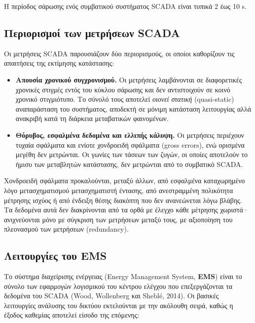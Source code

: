 Η περίοδος σάρωσης ενός συμβατικού συστήματος SCADA είναι τυπικά 2 έως 10 s.

\subsection{Περιορισμοί των μετρήσεων SCADA}

Οι μετρήσεις SCADA παρουσιάζουν δύο περιορισμούς, οι οποίοι καθορίζουν τις απαιτήσεις της
εκτίμησης κατάστασης:

\begin{itemize}
\item \textbf{Απουσία χρονικού συγχρονισμού.} Οι μετρήσεις λαμβάνονται σε διαφορετικές
      χρονικές στιγμές εντός του κύκλου σάρωσης και δεν αντιστοιχούν σε κοινό χρονικό
      στιγμιότυπο. Το σύνολό τους αποτελεί \emph{οιονεί στατική} (quasi-static)
      αναπαράσταση του συστήματος, αποδεκτή σε μόνιμη κατάσταση λειτουργίας αλλά
      ανακριβή κατά τη διάρκεια μεταβατικών φαινομένων.
\item \textbf{Θόρυβος, εσφαλμένα δεδομένα και ελλιπής κάλυψη.} Οι μετρήσεις περιέχουν
      τυχαία σφάλματα και ενίοτε χονδροειδή σφάλματα (gross errors), ενώ ορισμένα μεγέθη
      δεν μετρώνται. Οι γωνίες των τάσεων των ζυγών, οι οποίες αποτελούν το ήμισυ των
      μεταβλητών κατάστασης, δεν μετρώνται από το συμβατικό SCADA.
\end{itemize}

Χονδροειδή σφάλματα προκαλούνται, μεταξύ άλλων, από εσφαλμένα καταχωρημένο λόγο
μετασχηματισμού μετασχηματιστή έντασης, από ανεστραμμένη πολικότητα μέτρησης ισχύος ή από
ένδειξη θέσης διακόπτη που δεν ανανεώνεται λόγω βλάβης. Τα δεδομένα αυτά δεν διακρίνονται
από τα ορθά με έλεγχο κάθε μέτρησης χωριστά· ανιχνεύονται μόνο με σύγκριση των μετρήσεων
μεταξύ τους, με αξιοποίηση του πλεονασμού των μετρήσεων (redundancy).

\subsection{Λειτουργίες του EMS}

Το σύστημα διαχείρισης ενέργειας (Energy Management System, \textbf{EMS}) είναι το σύνολο των
εφαρμογών λογισμικού του κέντρου ελέγχου που επεξεργάζονται τα δεδομένα του SCADA (Wood,
Wollenberg και Sheblé, 2014). Οι βασικές λειτουργίες ανάλυσης του δικτύου εκτελούνται με την
ακόλουθη σειρά, καθώς η έξοδος καθεμίας αποτελεί είσοδο της επόμενης:

